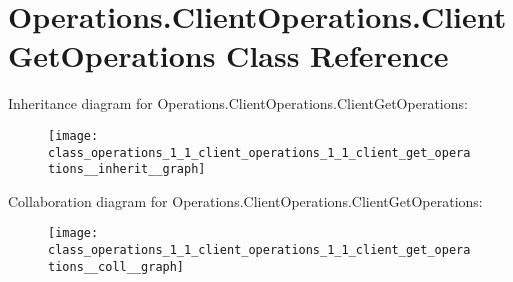 \hypertarget{class_operations_1_1_client_operations_1_1_client_get_operations}{}\section{Operations.\+Client\+Operations.\+Client\+Get\+Operations Class Reference}
\label{class_operations_1_1_client_operations_1_1_client_get_operations}


Inheritance diagram for Operations.\+Client\+Operations.\+Client\+Get\+Operations\+:
\nopagebreak
\begin{figure}[H]
\begin{center}
\leavevmode
\texttt{[image: class\_operations\_1\_1\_client\_operations\_1\_1\_client\_get\_operations\_\_inherit\_\_graph]}
\end{center}
\end{figure}


Collaboration diagram for Operations.\+Client\+Operations.\+Client\+Get\+Operations\+:
\nopagebreak
\begin{figure}[H]
\begin{center}
\leavevmode
\texttt{[image: class\_operations\_1\_1\_client\_operations\_1\_1\_client\_get\_operations\_\_coll\_\_graph]}
\end{center}
\end{figure}
